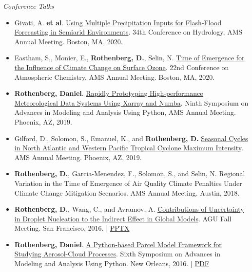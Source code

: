\documentclass[11pt,letterpaper]{article}
\begin{document}
\bigskip
\emph{Conference Talks}
\medskip
\begin{itemize}[itemindent=-10pt]

 \item Givati, A. \textbf{et al}. \href{https://ams.confex.com/ams/2020Annual/meetingapp.cgi/Paper/369441}{Using Multiple Precipitation Inputs for Flash-Flood Forecasting in Semiarid Environments}. 34th Conference on Hydrology, AMS Annual Meeting. Boston, MA, 2020.

 \item Eastham, S., Monier, E., \textbf{Rothenberg, D.}, Selin, N. \href{https://ams.confex.com/ams/2020Annual/meetingapp.cgi/Paper/369266}{Time of Emergence for the Influence of Climate Change on Surface Ozone}. 22nd Conference on Atmospheric Chemistry, AMS Annual Meeting. Boston, MA, 2020.

 \item \textbf{Rothenberg, Daniel}. \href{https://ams.confex.com/ams/2019Annual/meetingapp.cgi/Paper/348989}{Rapidly Prototyping High-performance Meteorological Data Systems Using Xarray and Numba}. Ninth Symposium on Advances in Modeling and Analysis Using Python, AMS Annual Meeting. Phoenix, AZ, 2019.

 \item Gilford, D., Solomon, S., Emanuel, K., and \textbf{Rothenberg, D.} \href{https://ams.confex.com/ams/2019Annual/meetingapp.cgi/Paper/349989}{Seasonal Cycles in North Atlantic and Western Pacific Tropical Cyclone Maximum Intensity}. AMS Annual Meeting. Phoenix, AZ, 2019.

 \item \textbf{Rothenberg, D.}, Garcia-Menendez, F., Solomon, S., and Selin, N. Regional Variation in the Time of Emergence of Air Quality Climate Penalties Under Climate Change Mitigation Scenarios. AMS Annual Meeting. Austin, 2018.

 \item \textbf{Rothenberg, D.}, Wang, C., and Avramov, A.
 \href{https://agu.confex.com/agu/fm16/meetingapp.cgi/Paper/193282}{Contributions of Uncertainty in Droplet Nucleation to the Indirect Effect in Global Models}. AGU Fall Meeting. San Francisco, 2016. | \href{https://figshare.com/articles/Contributions_of_Uncertainty_in_Droplet_Nucleation_to_the_Indirect_Effect_in_Global_Models/4503047}{PPTX}

 \item \textbf{Rothenberg, Daniel}. \href{https://ams.confex.com/ams/96Annual/webprogram/Paper286193.html}{A Python-based Parcel Model Framework for Studying Aerosol-Cloud Processes}. Sixth Symposium on Advances in Modeling and Analysis Using Python. New Orleans, 2016. | \href{https://figshare.com/articles/A_Python-based_Parcel_Model_Framework_for_Studying_Aerosol-Cloud_Processes/3475241}{PDF}


\end{itemize}
\end{document}
